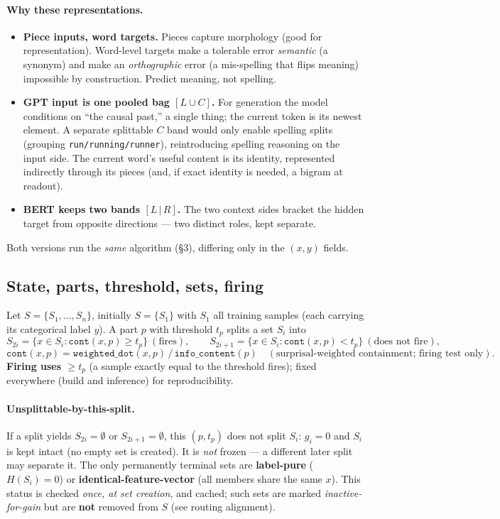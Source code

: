 \documentclass[11pt]{article}
\newcommand{\code}[1]{\texttt{#1}}
\newcommand{\cont}{\code{cont}}
\begin{document}
\paragraph{Why these representations.}
\begin{itemize}[nosep]
\item \textbf{Piece inputs, word targets.} Pieces capture morphology (good for representation). Word-level targets make a tolerable error \emph{semantic} (a synonym) and make an \emph{orthographic} error (a mis-spelling that flips meaning) impossible by construction. Predict meaning, not spelling.
\item \textbf{GPT input is one pooled bag $[L\cup C]$.} For generation the model conditions on ``the causal past,'' a single thing; the current token is its newest element. A separate splittable $C$ band would only enable spelling splits (grouping \code{run/running/runner}), reintroducing spelling reasoning on the input side. The current word's useful content is its identity, represented indirectly through its pieces (and, if exact identity is needed, a bigram at readout).
\item \textbf{BERT keeps two bands $[L\,|\,R]$.} The two context sides bracket the hidden target from opposite directions --- two distinct roles, kept separate.
\end{itemize}
Both versions run the \emph{same} algorithm (\S3), differing only in the $(x,y)$ fields.


\subsection{State, parts, threshold, sets, firing}
Let $S=\{S_1,\dots,S_n\}$, initially $S=\{S_1\}$ with $S_1$ all training samples (each carrying its categorical label $y$). A part $p$ with threshold $t_p$ splits a set $S_i$ into
\[
S_{2i}=\{x\in S_i : \cont(x,p)\ge t_p\}\ (\text{fires}),\qquad
S_{2i+1}=\{x\in S_i : \cont(x,p)< t_p\}\ (\text{does not fire}),
\]
\[
\cont(x,p)=\code{weighted\_dot}(x,p)\,/\,\code{info\_content}(p)\quad(\text{surprisal-weighted containment; firing test only}).
\]
\textbf{Firing uses $\ge t_p$} (a sample exactly equal to the threshold fires); fixed everywhere (build and inference) for reproducibility.

\paragraph{Unsplittable-by-this-split.} If a split yields $S_{2i}=\emptyset$ or $S_{2i+1}=\emptyset$, this $(p,t_p)$ does not split $S_i$: $g_i=0$ and $S_i$ is kept intact (no empty set is created). It is \emph{not} frozen --- a different later split may separate it. The only permanently terminal sets are \textbf{label-pure} ($H(S_i)=0$) or \textbf{identical-feature-vector} (all members share the same $x$). This status is checked \emph{once, at set creation}, and cached; such sets are marked \emph{inactive-for-gain} but are \textbf{not} removed from $S$ (see routing alignment).
\end{document}

